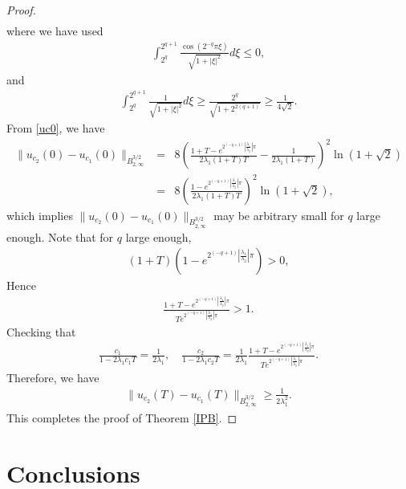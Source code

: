 \documentclass[11pt]{article}
\begin{document}
\begin{proof}
\begin{eqnarray*}
\end{eqnarray*}
where we have used
\begin{eqnarray*}
\int_{2^q}^{2^{q+1}}\frac{\cos(2^{-q}\pi\xi)}{\sqrt{1+|\xi|^2}}d\xi\leq 0,
\end{eqnarray*}
and
\begin{eqnarray*}
\int_{2^q}^{2^{q+1}}\frac{1}{\sqrt{1+|\xi|^2}}d\xi \geq \frac{2^q}{\sqrt{1+2^{2(q+1)}}} \geq\frac{1}{4\sqrt{2}}.
\end{eqnarray*}
From \eqref{uc0}, we have
\begin{eqnarray*}
\|u_{c_2}(0)-u_{c_1}(0)\|_{B_{2,\infty}^{3/2}}&=&8\left(\frac{1+T-e^{2^{(-q+1)}\left|\tfrac{\lambda_1}{\lambda_2}\right|\pi}}{2\lambda_1(1+T)T}-\frac{1}{2\lambda_1(1+T)}\right)^2\ln(1+\sqrt{2})\\
&=&8\left(\frac{1-e^{2^{(-q+1)}\left|\tfrac{\lambda_1}{\lambda_2}\right|\pi}}{2\lambda_1(1+T)T}\right)^2\ln (1+\sqrt{2}),
\end{eqnarray*}
which implies $\|u_{c_2}(0)-u_{c_1}(0)\|_{B_{2,\infty}^{3/2}}$ may be arbitrary small for $q$ large enough.
Note that for $q$ large enough,
\begin{eqnarray*}
(1+T)\left(1-e^{2^{(-q+1)}\left|\tfrac{\lambda_1}{\lambda_2}\right|\pi}\right)>0,
\end{eqnarray*}
Hence
\begin{eqnarray*}
\frac{1+T-e^{2^{(-q+1)}\left|\tfrac{\lambda_1}{\lambda_2}\right|\pi}}{Te^{2^{(-q+1)}\left|\tfrac{\lambda_1}{\lambda_2}\right|\pi}}>1.
\end{eqnarray*}
Checking that
\begin{eqnarray*}
\frac{c_1}{1-2\lambda_1c_1T}=\frac{1}{2\lambda_1},\quad  \frac{c_2}{1-2\lambda_1c_2T}=\frac{1}{2\lambda_1}\frac{1+T-e^{2^{(-q+1)}\left|\tfrac{\lambda_1}{\lambda_2}\right|\pi}}{Te^{2^{(-q+1)}\left|\tfrac{\lambda_1}{\lambda_2}\right|\pi}}.
\end{eqnarray*}
Therefore, we have
\begin{eqnarray*}
\|u_{c_2}(T)-u_{c_1}(T)\|_{B_{2,\infty}^{3/2}}\geq\frac{1}{2\lambda_1^2}.
\end{eqnarray*}
This completes the proof of Theorem \ref{IPB}.
\end{proof}



\section{Conclusions}
\end{document}
